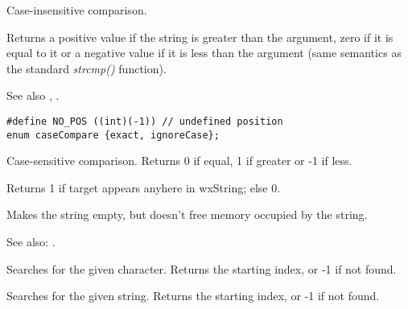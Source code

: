 \label{wxstringcmpnocase}


Case-insensitive comparison.

Returns a positive value if the string is greater than the argument, zero if
it is equal to it or a negative value if it is less than the argument (same semantics
as the standard {\it strcmp()} function).

See also , .

\label{wxstringcompareto}

\begin{verbatim}
#define NO_POS ((int)(-1)) // undefined position
enum caseCompare {exact, ignoreCase};
\end{verbatim}


Case-sensitive comparison. Returns 0 if equal, 1 if greater or -1 if less.

\label{wxstringcontains}


Returns 1 if target appears anyhere in wxString; else 0.

\label{wxstringempty}


Makes the string empty, but doesn't free memory occupied by the string.

See also: .

\label{wxstringfind}


Searches for the given character. Returns the starting index, or -1 if not found.


Searches for the given string. Returns the starting index, or -1 if not found.

\label{wxstringfirst}



